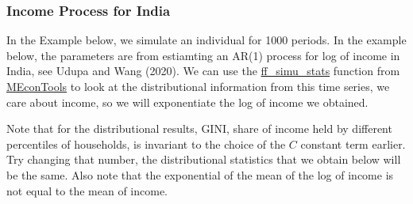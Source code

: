 \documentclass[
]{book}
\begin{document}
\hypertarget{income-process-for-india}{%
\subsubsection{Income Process for India}\label{income-process-for-india}}

In the Example below, we simulate an individual for 1000 periods. In the
example below, the parameters are from estiamting an AR(1) process for
log of income in India, see Udupa and Wang (2020). We can use the
\href{https://fanwangecon.github.io/MEconTools/MEconTools/doc/stats/htmlpdfm/fx_simu_stats.html}{ff\_simu\_stats}
function from \href{https://fanwangecon.github.io/MEconTools/}{MEconTools} to
look at the distributional information from this time series, we care
about income, so we will exponentiate the log of income we obtained.

Note that for the distributional results, GINI, share of income held by
different percentiles of households, is invariant to the choice of the
\(C\) constant term earlier. Try changing that number, the distributional
statistics that we obtain below will be the same. Also note that the
exponential of the mean of the log of income is not equal to the mean of
income.
\end{document}
